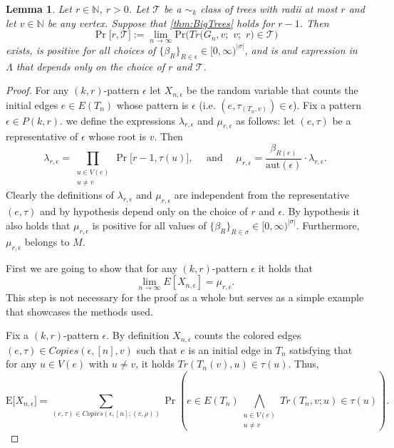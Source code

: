 \documentclass[12pt,notitlepage,a4paper]{article}
\newtheorem{lemma}{Lemma}[section]
\theoremstyle{definition}
\newcommand{\N}{\mathbb{N}}
\newcommand{\Ln}{\lim\limits_{n\to \infty}}
\newcommand{\PR}[1]{\mathrm{Pr}\big(#1\big)}
\newcommand{\aut}{\mathrm{aut}}
\begin{document}
	\begin{lemma} \label{lem:singletreeprob}
	Let $r\in \N$, $r>0$. Let $\mathcal{T}$ be a 
	$\sim_k$ class of trees with radii at most $r$ and 
	let $v\in \N$ be any vertex. 
	Suppose that \cref{thm:BigTrees} holds
	for $r-1$. Then \[
	\Pr\big[r, \mathcal{T}\big]:=
	\Ln  \PR{Tr\big(G_n,v;\,\,v;\,\,r\big)\in \mathcal{T}}
	\] 
	exists, is positive for all choices of 
	$\{\beta_R\}_{R\in \epsilon}\in [0,\infty)^{|\sigma|}$,
	and is and expression in $\Lambda$ that depends
	only on the choice of $r$ and $\mathcal{T}$.   
	\end{lemma}
	\begin{proof}
		For any $(k,r)$-pattern  $\epsilon$  let 
		$X_{n,\epsilon}$ be the random variable that counts
		the initial edges $e\in E(T_n)$ whose pattern
		is $\epsilon$ (i.e. $(e,\tau_{(T_n,v)})\in \epsilon$). 
		Fix a pattern $\epsilon\in P(k,r)$.
		we define the expressions $\lambda_{r,\epsilon}$ and
		 $\mu_{r,\epsilon}$ 
		as follows: let $(e,\tau)$ be a representative of $\epsilon$
		whose root is $v$. Then
		\[
		\lambda_{r,\epsilon}=\prod_{\substack{u\in V(e)\\ u\neq v} } \Pr\big[
		r-1, \tau(u)\big], \quad \text{ and } \quad
		\mu_{r,\epsilon}=\frac{\beta_{R(e)}}{\aut(\epsilon)} 
		\cdot \lambda_{r,\epsilon}.
		\]
		Clearly the definitions of $\lambda_{r,\epsilon}$ and $\mu_{r,\epsilon}$
		are independent from the representative $(e,\tau)$ and by hypothesis
		depend only on the choice of $r$ and $\epsilon$. By hypothesis it also holds
		that $\mu_{r,\epsilon}$ is positive for all values of
		$\{ \beta_R \}_{R\in \sigma}\in [0,\infty)^{|\sigma|}$.
		 Furthermore, 
		$\mu_{r,\epsilon}$ belongs to $M$.\par
		First we are going to show that for any
		$(k,r)$-pattern $\epsilon$ it holds that
	 	\[
	 	\Ln E[X_{n,\epsilon}] = \mu_{r,\epsilon}.
	 	\]
	 	This step is not necessary for the proof as a whole but serves as a 
	 	simple example that showcases the methods used.		
		\par
		Fix a $(k,r)$-pattern $\epsilon$. 
		By definition $X_{n,\epsilon}$ counts
		the colored edges $(e,\tau)\in Copies(\epsilon,[n],v)$ 
		such that $e$ is an initial edge in $T_n$ satisfying that
		for any $u\in V(e)$ with $u\neq v$, it holds
		$Tr(T_n(v),u)\in \tau(u)$. Thus,
		\[
		\mathrm{E}\big[ X_{n,\epsilon} \big]
		= \sum_{(e,\tau)\in Copies(\epsilon,[n];(v,\rho))} \Pr
		\left(e\in E(T_n)
		\bigwedge_{\substack{u\in V(e)\\ u\neq v} } Tr(T_{n}, v; u)\in 
		\tau(u) \right).
\]
\end{proof}
\end{document}
